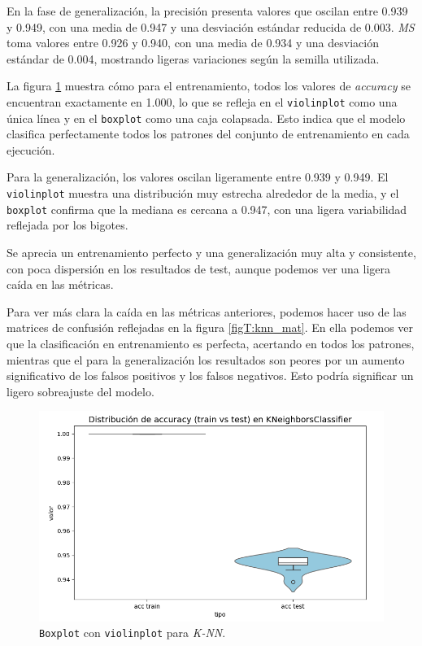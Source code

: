 \newpage
En la fase de generalización, la precisión presenta valores que oscilan entre 0.939 y 0.949, con una media de 0.947 y una desviación estándar reducida de 0.003. \textit{MS} toma valores entre 0.926 y 0.940, con una media de 0.934 y una desviación estándar de 0.004, mostrando ligeras variaciones según la semilla utilizada.

\vspace{1em}

La figura \ref{fig:knn_bin} muestra cómo para el entrenamiento, todos los valores de \textit{accuracy} se encuentran exactamente en 1.000, lo que se refleja en el \texttt{violinplot} como una única línea y en el \texttt{boxplot} como una caja colapsada. Esto indica que el modelo clasifica perfectamente todos los patrones del conjunto de entrenamiento en cada ejecución.

\vspace{1em}

Para la generalización, los valores oscilan ligeramente entre 0.939 y 0.949. El \texttt{violinplot} muestra una distribución muy estrecha alrededor de la media, y el \texttt{boxplot} confirma que la mediana es cercana a 0.947, con una ligera variabilidad reflejada por los bigotes.

\vspace{1em}

Se aprecia un entrenamiento perfecto y una generalización muy alta y consistente, con poca dispersión en los resultados de test, aunque podemos ver una ligera caída en las métricas.

\vspace{1em}

Para ver más clara la caída en las métricas anteriores, podemos hacer uso de las matrices de confusión reflejadas en la figura \ref{figT:knn_mat}. En ella podemos ver que la clasificación en entrenamiento es perfecta, acertando en todos los patrones, mientras que el para la generalización los resultados son peores por un aumento significativo de los falsos positivos y los falsos negativos. Esto podría significar un ligero sobreajuste del modelo.

\begin{figure}[H]
	\centering
	\includegraphics[width=1\linewidth]{Imagenes/knn_bin}
	\caption[\texttt{Boxplot} con \texttt{violinplot} para \textit{K-NN}]{\texttt{Boxplot} con \texttt{violinplot} para \textit{K-NN}.}
	\label{fig:knn_bin}
\end{figure}

